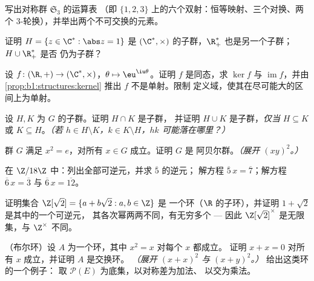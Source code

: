 \begin{exercise}[$\star$]\label{exo:b1:structures:3}
写出对称群 $\mathfrak{S}_3$ 的运算表
（即 $\{1,2,3\}$ 上的六个双射：恒等映射、三个对换、两个
$3$-轮换），并举出两个不可交换的元素。
\end{exercise}

\begin{exercise}[$\star$]\label{exo:b1:structures:4}
证明 $H = \{z \in \C^* : \abs z = 1\}$ 是 $(\C^*,
\times)$ 的子群，$\R_+^*$ 也是另一个子群；$H \cup \R_+^*$ 是否
仍为子群？
\end{exercise}

\begin{exercise}[$\star\star$]\label{exo:b1:structures:5}
设 $f \colon (\R, +) \to (\C^*, \times)$，$\theta \mapsto
\eu^{\iu\theta}$。证明 $f$ 是同态，求 $\ker f$ 与
$\operatorname{im} f$，并由
\cref{prop:b1:structures:kernel} 推出 $f$ 不是单射。限制
定义域，使其在尽可能大的区间上为单射。
\end{exercise}

\begin{exercise}[$\star\star$]\label{exo:b1:structures:6}
设 $H, K$ 为 $G$ 的子群。证明 $H \cap K$ 是子群，
并证明 $H \cup K$ 是子群，\emph{仅当} $H \subseteq K$ 或
$K \subseteq H$。\emph{（若 $h \in H \setminus K$，$k \in K
\setminus H$，$hk$ 可能落在哪里？）}
\end{exercise}

\begin{exercise}[$\star\star$]\label{exo:b1:structures:7}
群 $G$ 满足 $x^2 = e$，对所有 $x \in G$ 成立。证明 $G$ 是
阿贝尔群。\emph{（展开 $(xy)^2$。）}
\end{exercise}

\begin{exercise}[$\star\star$]\label{exo:b1:structures:8}
在 $\Z/18\Z$ 中：列出全部可逆元，并求 $\overline 5$ 的逆元；
解方程 $\overline 5\, x = \overline 7$；解方程 $\overline 6\, x =
\overline 3$ 与 $\overline 6\, x = \overline{12}$。
\end{exercise}

\begin{exercise}[$\star\star$]\label{exo:b1:structures:9}
证明集合 $\Z[\sqrt 2] = \{a + b\sqrt 2 : a, b \in \Z\}$ 是
一个环（$\R$ 的子环），并证明 $1 + \sqrt 2$ 是其中的一个可逆元，
其各次幂两两不同，有无穷多个 --- 因此 $\Z[\sqrt 2]^\times$
是无限集，与 $\Z^\times$ 不同。
\end{exercise}

\begin{exercise}[$\star\star\star$]\label{exo:b1:structures:10}
（布尔环）设 $A$ 为一个环，其中 $x^2 = x$ 对每个 $x$ 都成立。
证明 $x + x = 0$ 对所有 $x$ 成立，并证明 $A$ 是交换环。
\emph{（展开 $(x+x)^2$ 与 $(x+y)^2$。）} 给出这类环的一个例子：
取 $\mathcal{P}(E)$ 为底集，以对称差为加法、
以交为乘法。
\end{exercise}

